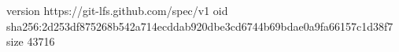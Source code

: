 version https://git-lfs.github.com/spec/v1
oid sha256:2d253df875268b542a714ecddab920dbe3cd6744b69bdae0a9fa66157c1d38f7
size 43716
